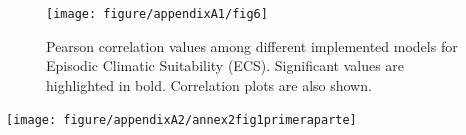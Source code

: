 \documentclass[11pt,twoside]{reedthesis}
\begin{document}
\begin{figure}[hbt!]

{\centering \texttt{[image: figure/appendixA1/fig6]} 

}

\caption[Pearson correlation values among different implemented models for Episodic Climatic Suitability (ECS)]{Pearson correlation values among different implemented models for Episodic Climatic Suitability (ECS). Significant values are highlighted in bold. Correlation plots are also shown.}\label{fig:apa16}
\end{figure}
\newpage

\setlength{\abovecaptionskip}{0pt}
\begin{center}\texttt{[image: figure/appendixA2/annex2fig1primeraparte]} \end{center}
\end{document}
